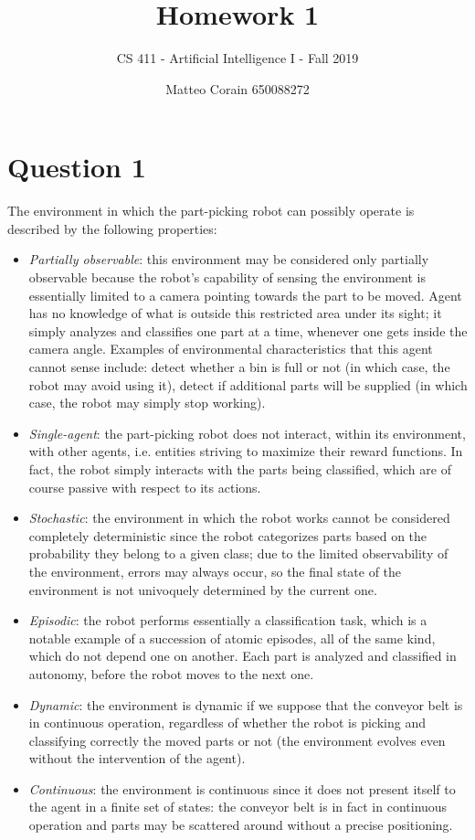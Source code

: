 \documentclass[letterpaper,headings=standardclasses]{scrartcl}
\title{Homework 1}
\subtitle{CS 411 - Artificial Intelligence I - Fall 2019}
\author{Matteo Corain 650088272}
\begin{document}
\maketitle

\section{Question 1}

The environment in which the part-picking robot can possibly operate is described by the following properties:

\begin{itemize}

\item \emph{Partially observable}: this environment may be considered only partially observable because the robot's capability of sensing the environment is essentially limited to a camera pointing towards the part to be moved. Agent has no knowledge of what is outside this restricted area under its sight; it simply analyzes and classifies one part at a time, whenever one gets inside the camera angle. Examples of environmental characteristics that this agent cannot sense include: detect whether a bin is full or not (in which case, the robot may avoid using it), detect if additional parts will be supplied (in which case, the robot may simply stop working).

\item \emph{Single-agent}: the part-picking robot does not interact, within its environment, with other agents, i.e. entities striving to maximize their reward functions. In fact, the robot simply interacts with the parts being classified, which are of course passive with respect to its actions.

\item \emph{Stochastic}: the environment in which the robot works cannot be considered completely deterministic since the robot categorizes parts based on the probability they belong to a given class; due to the limited observability of the environment, errors may always occur, so the final state of the environment is not univoquely determined by the current one.

\item \emph{Episodic}: the robot performs essentially a classification task, which is a notable example of a succession of atomic episodes, all of the same kind, which do not depend one on another. Each part is analyzed and classified in autonomy, before the robot moves to the next one.

\item \emph{Dynamic}: the environment is dynamic if we suppose that the conveyor belt is in continuous operation, regardless of whether the robot is picking and classifying correctly the moved parts or not (the environment evolves even without the intervention of the agent).

\item \emph{Continuous}: the environment is continuous since it does not present itself to the agent in a finite set of states: the conveyor belt is in fact in continuous operation and parts may be scattered around without a precise positioning.

\end{itemize}
\end{document}
